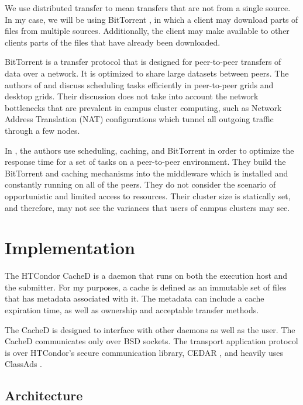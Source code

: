 We use distributed transfer to mean transfers that are not from a single source.  In my case, we will be using BitTorrent \cite{cohen2008BitTorrent}, in which a client may download parts of files from multiple sources.  Additionally, the client may make available to other clients parts of the files that have already been downloaded.

BitTorrent is a transfer protocol that is designed for peer-to-peer transfers of data over a network.  It is optimized to share large datasets between peers. The authors of \cite{wei2005scheduling} and \cite{wei2007towards} discuss scheduling tasks efficiently in peer-to-peer grids and desktop grids.  Their discussion does not take into account the network bottlenecks that are prevalent in campus cluster computing, such as Network Address Translation (NAT) configurations which tunnel all outgoing traffic through a few nodes.

In \cite{briquet2007scheduling}, the authors use scheduling, caching, and BitTorrent in order to optimize the response time for a set of tasks on a peer-to-peer environment.  They build the BitTorrent and caching mechanisms into the middleware which is installed and constantly running on all of the peers.  They do not consider the scenario of opportunistic and limited access to resources.  Their cluster size is statically set, and therefore, may not see the variances that users of campus clusters may see.



\section{Implementation}

The HTCondor CacheD is a daemon that runs on both the execution host and the submitter.  For my purposes, a cache is defined as an immutable set of files that has metadata associated with it.  The metadata can include a cache expiration time, as well as ownership and acceptable transfer methods.

The CacheD is designed to interface with other daemons as well as the user.  The CacheD communicates only over BSD sockets. The transport application protocol is over HTCondor's secure communication library, CEDAR \cite{miller2010flexible}, and heavily uses ClassAds \cite{raman1998matchmaking}.  

\subsection{Architecture}

